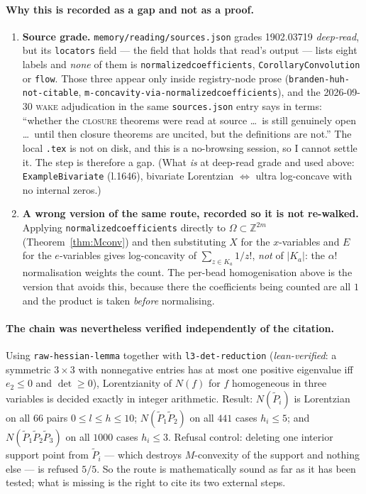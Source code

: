 \documentclass[11pt]{article}
\theoremstyle{plain}
\theoremstyle{definition}
\newcommand{\Z}{\mathbb{Z}}
\begin{document}
\paragraph{Why this is recorded as a gap and not as a proof.}
\begin{enumerate}
\item \textbf{Source grade.} \texttt{memory/reading/sources.json} grades 1902.03719
  \emph{deep-read}, but its \verb|locators| field --- the field that holds that read's
  output --- lists eight labels and \emph{none} of them is
  \verb|normalizedcoefficients|, \verb|CorollaryConvolution| or \verb|flow|. Those three
  appear only inside registry-node prose (\texttt{branden-huh-not-citable},
  \texttt{m-concavity-via-normalizedcoefficients}), and the 2026-09-30 \textsc{wake}
  adjudication in the same \texttt{sources.json} entry says in terms: ``whether the
  \textsc{closure} theorems were read at source \ldots\ is still genuinely open
  \ldots\ until then closure theorems are uncited, but the definitions are not.'' The
  local \texttt{.tex} is not on disk, and this is a no-browsing session, so I cannot
  settle it. The step is therefore a gap. (What \emph{is} at deep-read grade and used
  above: \verb|ExampleBivariate| (l.1646), bivariate Lorentzian $\iff$ ultra log-concave
  with no internal zeros.)
\item \textbf{A wrong version of the same route, recorded so it is not re-walked.}
  Applying \verb|normalizedcoefficients| directly to $\Omega\subset\Z^{2m}$
  (Theorem~\ref{thm:Mconv}) and then substituting $X$ for the $x$-variables and $E$ for
  the $e$-variables gives log-concavity of $\sum_{z\in K_a}1/z!$, \emph{not} of $|K_a|$:
  the $\alpha!$ normalisation weights the count. The per-bead homogenisation above is the
  version that avoids this, because there the coefficients being counted are all $1$ and
  the product is taken \emph{before} normalising.
\end{enumerate}

\paragraph{The chain was nevertheless verified independently of the citation.}
Using \texttt{raw-hessian-lemma} together with \texttt{l3-det-reduction}
(\emph{lean-verified}: a symmetric $3\times3$ with nonnegative entries has at most one
positive eigenvalue iff $e_2\le0$ and $\det\ge0$), Lorentzianity of
$N(f)$ for $f$ homogeneous in three variables is decided exactly in integer arithmetic.
Result: $N(\widetilde P_i)$ is Lorentzian on all $66$ pairs $0\le l\le h\le10$;
$N(\widetilde P_1\widetilde P_2)$ on all $441$ cases $h_i\le5$; and
$N(\widetilde P_1\widetilde P_2\widetilde P_3)$ on all $1000$ cases $h_i\le3$.
Refusal control: deleting one interior support point from $\widetilde P_i$ --- which
destroys $M$-convexity of the support and nothing else --- is refused $5/5$. So the route
is mathematically sound as far as it has been tested; what is missing is the right to cite
its two external steps.
\end{document}

